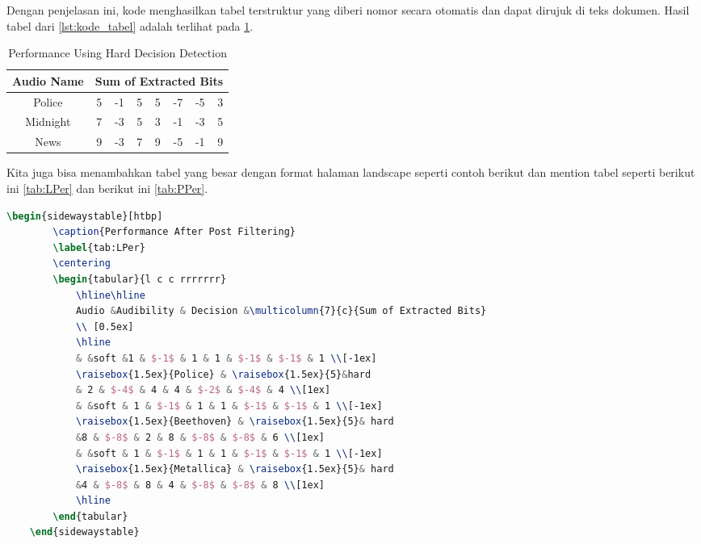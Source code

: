 Dengan penjelasan ini, kode menghasilkan tabel terstruktur yang diberi nomor secara otomatis dan dapat dirujuk di teks dokumen. Hasil tabel dari \cref{lst:kode_tabel} adalah terlihat pada \cref{tab:hresult}.

\begin{table}[h]
    \caption{Performance Using Hard Decision Detection}
    \label{tab:hresult}
    \centering
    \begin{tabular}{c rrrrrrr}
        \hline\hline
        Audio Name&\multicolumn{7}{c}{Sum of Extracted Bits} \\ [0.5ex] 
        \hline
        Police & 5 & -1 & 5& 5& -7& -5& 3\\
        Midnight & 7 & -3 & 5& 3& -1& -3& 5\\
        News & 9 & -3 & 7& 9& -5& -1& 9\\[0.8ex]
        \hline
    \end{tabular}
\end{table}

Kita juga bisa menambahkan tabel yang besar dengan format halaman landscape seperti contoh berikut dan mention tabel seperti berikut ini \cref{tab:LPer} dan berikut ini \cref{tab:PPer}.

\begin{lstlisting}[language=TeX, caption=Kode untuk Membuat Tabel dalam Dokumen dengan Sideway, label=lst:kode_tabel_sideway]
    \begin{sidewaystable}[htbp]
        \caption{Performance After Post Filtering}
        \label{tab:LPer}
        \centering
        \begin{tabular}{l c c rrrrrrr}
            \hline\hline
            Audio &Audibility & Decision &\multicolumn{7}{c}{Sum of Extracted Bits} 
            \\ [0.5ex] 
            \hline
            & &soft &1 & $-1$ & 1 & 1 & $-1$ & $-1$ & 1 \\[-1ex]
            \raisebox{1.5ex}{Police} & \raisebox{1.5ex}{5}&hard
            & 2 & $-4$ & 4 & 4 & $-2$ & $-4$ & 4 \\[1ex]
            & &soft & 1 & $-1$ & 1 & 1 & $-1$ & $-1$ & 1 \\[-1ex]
            \raisebox{1.5ex}{Beethoven} & \raisebox{1.5ex}{5}& hard
            &8 & $-8$ & 2 & 8 & $-8$ & $-8$ & 6 \\[1ex]
            & &soft & 1 & $-1$ & 1 & 1 & $-1$ & $-1$ & 1 \\[-1ex]
            \raisebox{1.5ex}{Metallica} & \raisebox{1.5ex}{5}& hard
            &4 & $-8$ & 8 & 4 & $-8$ & $-8$ & 8 \\[1ex]
            \hline
        \end{tabular}
    \end{sidewaystable}
\end{lstlisting}

